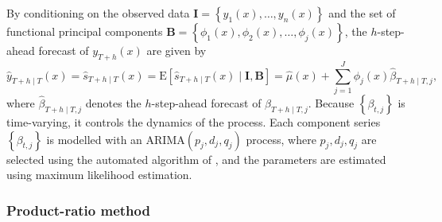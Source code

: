 \documentclass[11pt,a4paper,]{article}
\begin{document}
By conditioning on the observed data \(\bm{I}=\left\{{y_1(x),\dots,y_n(x)}\right\}\) and the set of functional principal components \(\bm{B}=\left\{{\phi_1(x),\phi_2(x),\dots,\phi_j(x)}\right\}\), the \(h\)-step-ahead forecast of \(y_{T+h}(x)\) are given by
\begin{equation}
  \widehat{y}_{T+h\mid T}(x)=\widehat{s}_{T+h\mid T}(x) = \text{E}[\widehat{s}_{T+h\mid T}(x)\mid \bm{I, B}] = \widehat{\mu}(x)+\sum_{j=1}^{J}\phi_j(x)\widehat{\beta}_{T+h\mid T,j},
\end{equation}
where \(\widehat{\beta}_{T+h\mid T,j}\) denotes the \(h\)-step-ahead forecast of \(\beta_{T+h\mid T,j}\). Because \(\left\{\beta_{t,j}\right\}\) is time-varying, it controls the dynamics of the process. Each component series \(\left\{\beta_{t,j}\right\}\) is modelled with an ARIMA\((p_j,d_j,q_j)\) process, where \(p_j,d_j,q_j\) are selected using the automated algorithm of \textcite{forecastpackage}, and the parameters are estimated using maximum likelihood estimation.

\hypertarget{product-ratio-method}{%
\subsubsection*{Product-ratio method}\label{product-ratio-method}}
\end{document}
